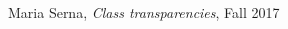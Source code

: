 \begin{thebibliography}{9}

  Maria Serna,
  \emph{Class transparencies},
  Fall 2017
\end{thebibliography}
